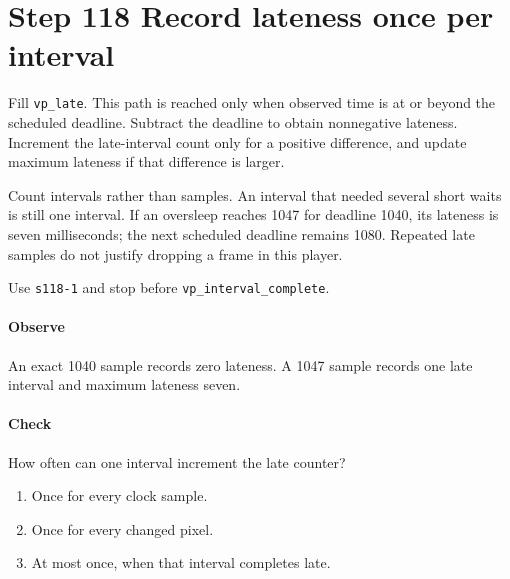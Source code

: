 \section{Step 118 Record lateness once per interval}
Fill \texttt{vp\_late}. This path is reached only when observed time is at or beyond the scheduled deadline. Subtract the deadline to obtain nonnegative lateness. Increment the late-interval count only for a positive difference, and update maximum lateness if that difference is larger.

Count intervals rather than samples. An interval that needed several short waits is still one interval. If an oversleep reaches 1047 for deadline 1040, its lateness is seven milliseconds; the next scheduled deadline remains 1080. Repeated late samples do not justify dropping a frame in this player.

Use \texttt{s118-1} and stop before \texttt{vp\_interval\_complete}.

\paragraph{Observe} An exact 1040 sample records zero lateness. A 1047 sample records one late interval and maximum lateness seven.

\paragraph{Check} How often can one interval increment the late counter?
\begin{enumerate}[label=\Alph*.]
\item Once for every clock sample.
\item Once for every changed pixel.
\item At most once, when that interval completes late.
\end{enumerate}
